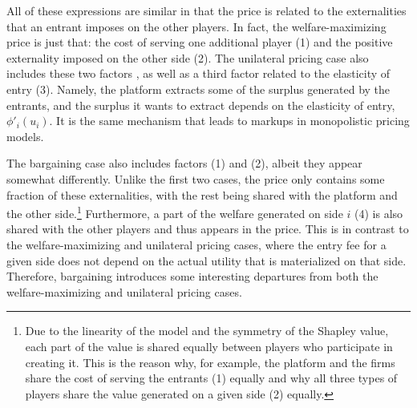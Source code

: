 All of these expressions are similar in that the price is related to the externalities that an entrant imposes on the other players.
In fact, the welfare-maximizing price is just that: the cost of serving one additional player (1) and the positive externality imposed on the other side (2).
The unilateral pricing case also includes these two factors , as well as a third factor related to the elasticity of entry (3).
Namely, the platform extracts some of the surplus generated by the entrants, and the surplus it wants to extract depends on the elasticity of entry, $\phi'_i(u_i)$.
It is the same mechanism that leads to markups in monopolistic pricing models.

The bargaining case also includes factors (1) and (2), albeit they appear somewhat differently.
Unlike the first two cases, the price only contains some fraction of these externalities, with the rest being shared with the platform and the other side.\footnote{
    Due to the linearity of the model and the symmetry of the Shapley value, each part of the value is shared equally between players who participate in creating it.
    This is the reason why, for example, the platform and the firms share the cost of serving the entrants (1) equally and why all three types of players share the value generated on a given side (2) equally.
}
Furthermore, a part of the welfare generated on side $i$ (4) is also shared with the other players and thus appears in the price.
This is in contrast to the welfare-maximizing and unilateral pricing cases, where the entry fee for a given side does not depend on the actual utility that is materialized on that side.
Therefore, bargaining introduces some interesting departures from both the welfare-maximizing and unilateral pricing cases.

